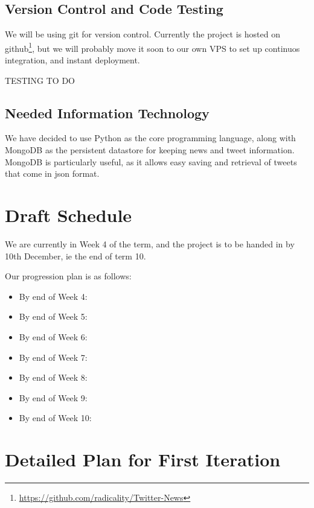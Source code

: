 \documentclass[a4paper,11pt]{article}
\begin{document}
	
		\subsection{Version Control and Code Testing}
		
			We will be using git for version control. Currently the project is hosted on github\footnote{\url{https://github.com/radicality/Twitter-News}}, but we will probably move it soon to our own VPS to set up continuos integration, and instant deployment.
			
			TESTING TO DO
			
			
		\subsection{Needed Information Technology}
			We have decided to use Python as the core programming language, along with MongoDB as the persistent datastore for keeping news and tweet information. MongoDB is particularly useful, as it allows easy saving and retrieval of tweets that come in json format.
			
	
	\section{Draft Schedule}
	
		We are currently in Week 4 of the term, and the project is to be handed in by 10th December, ie the end of term 10.
		
		Our progression plan is as follows:
		
		\begin{itemize}
			\item By end of Week 4: 
			\item By end of Week 5: 
			\item By end of Week 6: 
			\item By end of Week 7: 
			\item By end of Week 8: 
			\item By end of Week 9: 
			\item By end of Week 10:
		\end{itemize}
	
	\section{Detailed Plan for First Iteration}
	
		
\end{document}
